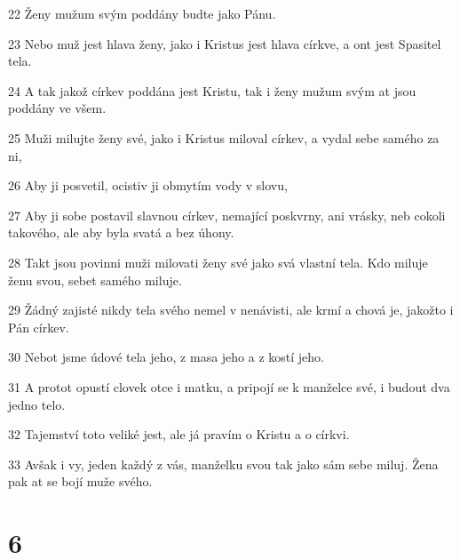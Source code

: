 \par 22 Ženy mužum svým poddány budte jako Pánu.
\par 23 Nebo muž jest hlava ženy, jako i Kristus jest hlava církve, a ont jest Spasitel tela.
\par 24 A tak jakož církev poddána jest Kristu, tak i ženy mužum svým at jsou poddány ve všem.
\par 25 Muži milujte ženy své, jako i Kristus miloval církev, a vydal sebe samého za ni,
\par 26 Aby ji posvetil, ocistiv ji obmytím vody v slovu,
\par 27 Aby ji sobe postavil slavnou církev, nemající poskvrny, ani vrásky, neb cokoli takového, ale aby byla svatá a bez úhony.
\par 28 Takt jsou povinni muži milovati ženy své jako svá vlastní tela. Kdo miluje ženu svou, sebet samého miluje.
\par 29 Žádný zajisté nikdy tela svého nemel v nenávisti, ale krmí a chová je, jakožto i Pán církev.
\par 30 Nebot jsme údové tela jeho, z masa jeho a z kostí jeho.
\par 31 A protot opustí clovek otce i matku, a pripojí se k manželce své, i budout dva jedno telo.
\par 32 Tajemství toto veliké jest, ale já pravím o Kristu a o církvi.
\par 33 Avšak i vy, jeden každý z vás, manželku svou tak jako sám sebe miluj. Žena pak at se bojí muže svého.

\chapter{6}

